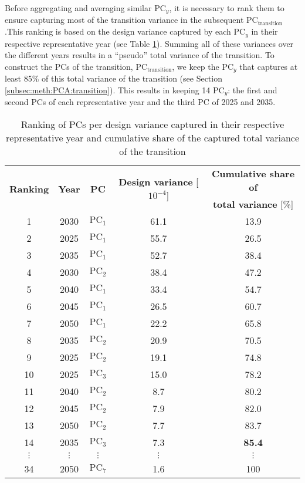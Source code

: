 Before aggregating and averaging similar $\text{PC}_{y}$, it is necessary to rank them to ensure capturing most of the transition variance in the subsequent $\text{PC}_{\text{transition}}$.This ranking is based on the design variance captured by each $\text{PC}_{y}$ in their respective representative year (see Table \ref{tab:ranking_PCs}). Summing all of these variances over the different years results in a ``pseudo'' total variance of the transition. To construct the \gls{PCs} of the transition, $\text{PC}_{\text{transition}}$, we keep the $\text{PC}_{y}$ that captures at least 85\% of this total variance of the transition (see Section \ref{subsec:meth:PCA:transition}).  This results in keeping 14 $\text{PC}_{y}$: the first and second \gls{PCs} of each representative year and the third PC of 2025 and 2035. 

\begin{table}[htbp!]
\caption{Ranking of \gls{PCs} per design variance captured in their respective representative year and cumulative share of the captured total variance of the transition}
\label{tab:ranking_PCs}
\centering
\begin{tabular}{c c c c c}
\toprule
\multirow{2}{*}{\textbf{Ranking}} & \multirow{2}{*}{\textbf{Year}}  & \multirow{2}{*}{\textbf{PC}} & \multirow{2}{*}{\textbf{Design variance} [$10^{-4}$]} & \textbf{Cumulative share of} \\	
 &   &  &  & \textbf{total variance} [\%] \\	
 \midrule	
1 & 2030 & $\text{PC}_1$ & 61.1 & 13.9 \\
2 & 2025 & $\text{PC}_1$ & 55.7 & 26.5 \\
3 & 2035 & $\text{PC}_1$ & 52.7 & 38.4 \\
4 & 2030 & $\text{PC}_2$ & 38.4 & 47.2 \\
5 & 2040 & $\text{PC}_1$ & 33.4 & 54.7 \\
6 & 2045 & $\text{PC}_1$ & 26.5 & 60.7 \\
7 & 2050 & $\text{PC}_1$ & 22.2 & 65.8 \\
8 & 2035 & $\text{PC}_2$ & 20.9 & 70.5 \\
9 & 2025 & $\text{PC}_2$ & 19.1 & 74.8 \\
10 & 2025 & $\text{PC}_3$ & 15.0 & 78.2 \\
11 & 2040 & $\text{PC}_2$ & 8.7 & 80.2 \\
12 & 2045 & $\text{PC}_2$ & 7.9 & 82.0 \\
13 & 2050 & $\text{PC}_2$ & 7.7 & 83.7 \\
14 & 2035 & $\text{PC}_3$ & 7.3 & \textbf{85.4} \\
$\vdots$ & $\vdots$ & $\vdots$ & $\vdots$ & $\vdots$\\
34 & 2050 & $\text{PC}_7$ & 1.6 & 100 \\
\bottomrule							

\end{tabular}
\end{table}

